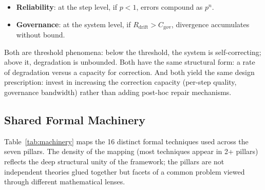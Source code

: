 \begin{itemize}[nosep]
    \item \textbf{Reliability}: at the step level, if $p < 1$, errors compound as $p^n$.
    \item \textbf{Governance}: at the system level, if $R_{\text{drift}} > C_{\text{gov}}$, divergence accumulates without bound.
\end{itemize}

Both are threshold phenomena: below the threshold, the system is self-correcting; above it, degradation is unbounded. Both have the same structural form: a rate of degradation versus a capacity for correction. And both yield the same design prescription: invest in increasing the correction capacity (per-step quality, governance bandwidth) rather than adding post-hoc repair mechanisms.

\subsection{Shared Formal Machinery}
\label{sec:shared-machinery}

Table~\ref{tab:machinery} maps the 16 distinct formal techniques used across the seven pillars. The density of the mapping (most techniques appear in 2+ pillars) reflects the deep structural unity of the framework; the pillars are not independent theories glued together but facets of a common problem viewed through different mathematical lenses.

